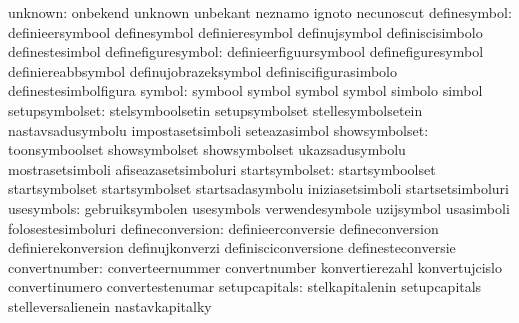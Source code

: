                          unknown: onbekend                         unknown
                                  unbekant                         neznamo
                                  ignoto                           necunoscut
                    definesymbol: definieersymbool                 definesymbol
                                  definieresymbol                  definujsymbol
                                  definiscisimbolo                 definestesimbol
              definefiguresymbol: definieerfiguursymbool           definefiguresymbol
                                  definiereabbsymbol               definujobrazeksymbol
                                  definiscifigurasimbolo           definestesimbolfigura
                          symbol: symbool                          symbol
                                  symbol                           symbol
                                  simbolo                          simbol
                  setupsymbolset: stelsymboolsetin                 setupsymbolset
                                  stellesymbolsetein               nastavsadusymbolu
                                  impostasetsimboli                seteazasimbol
                   showsymbolset: toonsymboolset                   showsymbolset
                                  showsymbolset                    ukazsadusymbolu
                                  mostrasetsimboli                 afiseazasetsimboluri
                  startsymbolset: startsymboolset                  startsymbolset
                                  startsymbolset                   startsadasymbolu
                                  iniziasetsimboli                 startsetsimboluri
                      usesymbols: gebruiksymbolen                  usesymbols
                                  verwendesymbole                  uzijsymbol
                                  usasimboli                       folosestesimboluri
                defineconversion: definieerconversie               defineconversion
                                  definierekonversion              definujkonverzi
                                  definisciconversione             definesteconversie
                   convertnumber: converteernummer                 convertnumber
                                  konvertierezahl                  konvertujcislo
                                  convertinumero                   convertestenumar
                   setupcapitals: stelkapitalenin                  setupcapitals
                                  stelleversalienein               nastavkapitalky
